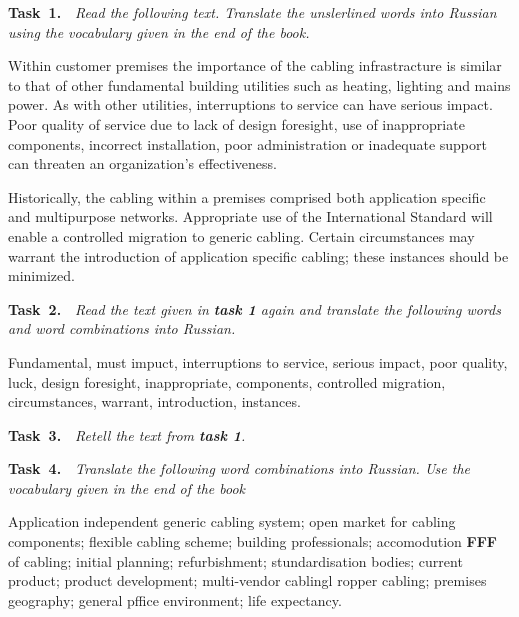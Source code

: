 {\bf Task~1.}~~{\it Read the following text. Translate the unslerlined words into Russian using the
vocabulary given in the end of the book.}\par
Within customer premises the importance of the cabling infrastracture is similar to that of other
fundamental building utilities such as heating, lighting and mains power. As with other utilities,
interruptions to service can have serious impact. Poor quality of service due to lack of design foresight,
use of inappropriate components, incorrect installation, poor administration or inadequate support can
threaten an organization's effectiveness.\par
Historically, the cabling within a premises comprised both application specific and multipurpose
networks. Appropriate use of the International Standard will enable a controlled migration to generic
cabling. Certain circumstances may warrant the introduction of application specific cabling; these
instances should be minimized.\par

{\bf Task~2.}~~{\it Read the text given in {\bf task 1} again and translate the following words and word
combinations into Russian.}\par
Fundamental, must impuct, interruptions to service, serious impact, poor quality, luck, design
foresight, inappropriate, components, controlled migration, circumstances, warrant, introduction, instances.\par

{\bf Task~3.}~~{\it Retell the text from {\bf task 1}.}\par

{\bf Task~4.}~~{\it Translate the following word combinations into Russian. Use the vocabulary given in the end
of the book}\par
Application independent generic cabling system; open market for cabling components; flexible
cabling scheme; building professionals; accomodution \textbf{FFF} of cabling; initial planning; refurbishment;
stundardisation bodies; current product; product development; multi-vendor cablingl ropper cabling;
premises geography; general pffice environment; life expectancy.\par

